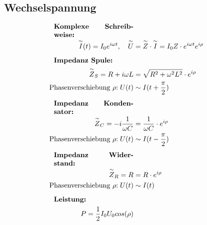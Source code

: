 \subsection{Wechselspannung}
    \vspace{-1em}
    \begin{align*}
        \parbox{4cm}{\textbf{Komplexe Schreibweise:}}\\
        \overset{\sim}{I}(t) = I_0 e^{i \omega t}, \quad \overset{\sim}{U} &= \overset{\sim}{Z} \cdot \overset{\sim}{I} = I_0 Z \cdot e^{i \omega t} e^{i \rho}
        \\[0.5em]
        \parbox{4cm}{\textbf{Impedanz Spule:}}\\
        \overset{\sim}{Z}_S = R + i \omega L &= \sqrt{R^2 + \omega^2 L ^2} \cdot e^{i \rho}\\
        \text{Phasenverschiebung $\rho$:} \; U(t) &\sim I(t + \frac{\pi}{2})
        \\[0.5em]
        \parbox{4cm}{\textbf{Impedanz Kondensator:}}\\
        \overset{\sim}{Z}_C = - i\frac{1}{\omega C} &= \frac{1}{\omega C} \cdot e^{i \rho}\\
        \text{Phasenverschiebung $\rho$:} \; U(t) &\sim I(t - \frac{\pi}{2})
        \\[0.5em]
        \parbox{4cm}{\textbf{Impedanz Widerstand:}}\\
        \overset{\sim}{Z}_R = R &= R \cdot e^{i \rho}\\
        \text{Phasenverschiebung $\rho$:} \; U(t) &\sim I(t)
        \\[0.5em]
        \parbox{4cm}{\textbf{Leistung:}}\\
        P = \frac{1}{2} I_0 U_0 cos(\rho)
    \end{align*}



